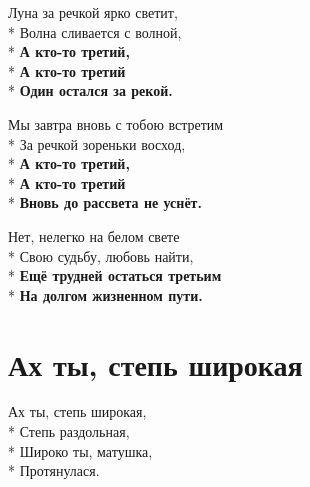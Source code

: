 \medskip

\begin{minipage}{\linewidth}
Луна за речкой ярко светит,\\*
Волна сливается с волной,\\*
\textbf{А кто-то третий,}\\*
\textbf{А кто-то третий}\\*
\textbf{Один остался за рекой.}\\
\end{minipage}\par\medskip\nobreak

\medskip

\begin{minipage}{\linewidth}
Мы завтра вновь с тобою встретим\\*
За речкой зореньки восход,\\*
\textbf{А кто-то третий,}\\*
\textbf{А кто-то третий}\\*
\textbf{Вновь до рассвета не уснёт.}\\
\end{minipage}\par\medskip\nobreak

\medskip

\begin{minipage}{\linewidth}
Нет, нелегко на белом свете\\*
Свою судьбу, любовь найти,\\*
\textbf{Ещё трудней остаться третьим}\\*
\textbf{На долгом жизненном пути.}\\
\end{minipage}

\vspace{\fill}\newpage

\section{Ах ты, степь широкая}
\label{song:Ах_ты,_степь_широкая}

\medskip

\begin{minipage}{\linewidth}
Ах ты, степь широкая,\\*
Степь раздольная,\\*
Широко ты, матушка,\\*
Протянулася.\\
\end{minipage}\par\medskip\nobreak


